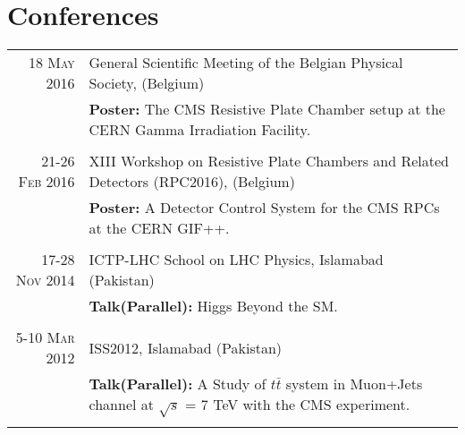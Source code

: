 \documentclass[a4paper,10pt]{article}
\begin{document}
\section{Conferences}
\begin{tabular}{rp{11.3cm}}
\textsc{18 May 2016} & General Scientific Meeting of the Belgian Physical Society, (Belgium) \\& \textbf{Poster:} The CMS Resistive Plate Chamber setup at the CERN Gamma Irradiation Facility.\\\multicolumn{2}{c}{} \\
\textsc{21-26 Feb 2016} & XIII Workshop on Resistive Plate Chambers and Related Detectors (RPC2016), (Belgium) \\& \textbf{Poster:} A Detector Control System for the CMS RPCs at the CERN GIF++.\\\multicolumn{2}{c}{} \\
\textsc{17-28 Nov 2014} & ICTP-LHC School on LHC Physics, Islamabad (Pakistan) \\& \textbf{Talk(Parallel):} Higgs Beyond the SM.\\\multicolumn{2}{c}{} \\
\textsc{5-10 Mar 2012} & ISS2012, Islamabad (Pakistan) \\& \textbf{Talk(Parallel):} A Study of $t\bar{t}$ system in Muon+Jets channel at $\sqrt{s}$ = 7 TeV with the CMS experiment. \\\multicolumn{2}{c}{} \\
\end{tabular}

\end{document}
